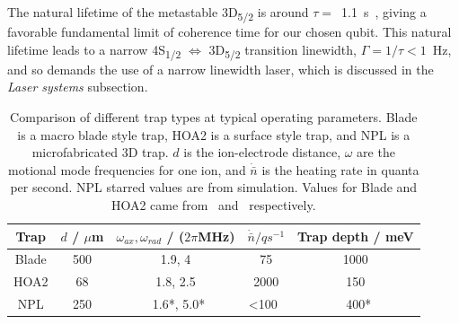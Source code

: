 \documentclass[12pt]{iopart}
\begin{document}

The natural lifetime of the metastable 3D\textsubscript{5/2} is around
$\tau =$~1.1~s~\cite{barton_measurement_2000}, giving a favorable fundamental limit of coherence
time for our chosen qubit.  This natural lifetime leads to a narrow
4S\textsubscript{1/2} $\Leftrightarrow$ 3D\textsubscript{5/2}
transition linewidth, $\Gamma = 1/\tau < 1$~Hz, and so demands the use of a
narrow linewidth laser, which is discussed in the \textit{Laser
  systems} subsection.

\begin{table}[h!]
\begin{center}
\begin{tabular}{ c|c c c c }
  Trap & $d$ / $\mu$m & $\omega_{ax}, \omega_{rad}$ / ($2\pi$MHz) & $\dot{\bar{n}} / qs^{-1}$ & Trap depth / meV \\ 
  \hline
  Blade  & 500 & 1.9, 4 & 75 & 1000 \\
  HOA2  & 68 & 1.8, 2.5 & 2000 & 150 \\
  NPL  & 250 & ~1.6*, 5.0* & <100~ & ~400* 
\end{tabular}
\caption{Comparison of different trap types at typical operating
  parameters. Blade is a macro blade style trap, HOA2 is a surface
  style trap, and NPL is a microfabricated 3D trap. $d$ is the
  ion-electrode distance, $\omega$ are the motional mode frequencies
  for one ion, and $\dot{\bar{n}}$ is the heating rate in quanta per
  second. NPL starred values are from simulation. Values for Blade and
  HOA2 came from~\cite{schafer_fast_2020, hughes_benchmarking_2021} and~\cite{nadlinger_device-independent_2022, nichol_thesis_2022}
  respectively. }
\label{table:trap}

\end{center}
\end{table}
\end{document}
